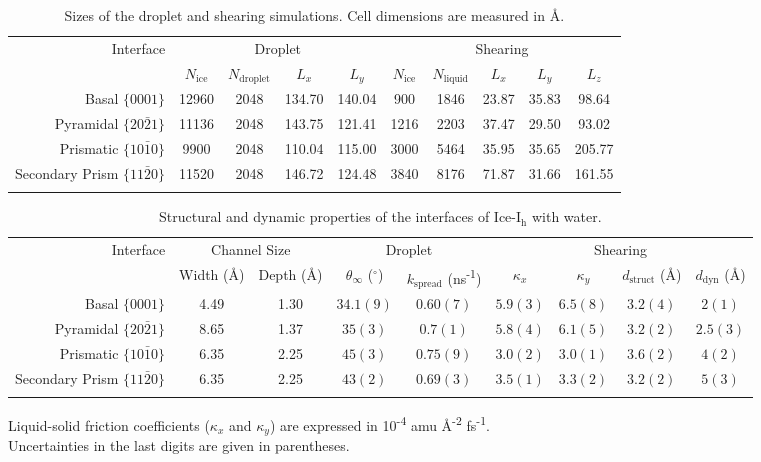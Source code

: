 \begin{table}[h]
\centering
\caption{Sizes of the droplet and shearing simulations.  Cell
  dimensions are measured in \AA. \label{tab:method}}
\begin{tabular}{r|cccc|ccccc} 
\toprule
 \multirow{2}{*}{Interface} & \multicolumn{4}{c|}{Droplet} & \multicolumn{5}{c}{
Shearing} \\
  & $N_\mathrm{ice}$ & $N_\mathrm{droplet}$ & $L_x$ & $L_y$ & $N_\mathrm{ice}$ &
 $N_\mathrm{liquid}$ & $L_x$ & $L_y$ & $L_z$  \\ 
\colrule
Basal  $\{0001\}$                    & 12960 & 2048 & 134.70 & 140.04 & 900 & 1846  & 23.87 & 35.83 & 98.64  \\
Pyramidal  $\{20\bar{2}1\}$       & 11136 & 2048 & 143.75 & 121.41 & 1216 & 2203 & 37.47 & 29.50 & 93.02  \\
Prismatic  $\{10\bar{1}0\}$       &  9900 & 2048 & 110.04 & 115.00 & 3000 & 5464 & 35.95 & 35.65 & 205.77 \\
Secondary Prism  $\{11\bar{2}0\}$ & 11520 & 2048 & 146.72 & 124.48 & 3840 & 8176 & 71.87 & 31.66 & 161.55 \\
\botrule
\end{tabular}
\end{table}


\begin{table}[h]
\centering
\caption{Structural and dynamic properties of the interfaces of
  Ice-I$_\mathrm{h}$ with water.\label{tab:kappa}}
\begin{tabular}{r|cc|cc|cccc}  
\toprule
\multirow{2}{*}{Interface} & \multicolumn{2}{c|}{Channel Size} &\multicolumn{2}{c|}{Droplet} & \multicolumn{4}{c}{Shearing\footnotemark[1]}\\
  & Width (\AA) & Depth (\AA) & $\theta_{\infty}$ ($^\circ$)  & $k_\mathrm{spread}$  (ns\textsuperscript{-1}) &
$\kappa_{x}$  & $\kappa_{y}$ & $d_\mathrm{struct}$ (\AA) &  $d_\mathrm{dyn}$ (\AA) \\ 
\colrule
Basal  $\{0001\}$                    & 4.49 & 1.30 & $34.1(9)$ &$0.60(7)$
& $5.9(3)$ & $6.5(8)$ & $3.2(4)$ & $2(1)$  \\
Pyramidal  $\{20\bar{2}1\}$       & 8.65 & 1.37 & $35(3)$ &  $0.7(1)$ &
$5.8(4)$ & $6.1(5)$ & $3.2(2)$ & $2.5(3)$\\
Prismatic  $\{10\bar{1}0\}$       & 6.35 & 2.25 & $45(3)$ & $0.75(9)$ &
$3.0(2)$ & $3.0(1)$ & $3.6(2)$ & $4(2)$ \\
Secondary Prism  $\{11\bar{2}0\}$ & 6.35 & 2.25 & $43(2)$ & $0.69(3)$ &
$3.5(1)$ & $3.3(2)$ & $3.2(2)$ & $5(3)$ \\ 
\botrule
\end{tabular}
\begin{flushleft}
\footnotemark[1]\footnotesize{Liquid-solid friction coefficients ($\kappa_x$ and
  $\kappa_y$) are expressed in 10\textsuperscript{-4} amu
  \AA\textsuperscript{-2} fs\textsuperscript{-1}.} \\
\footnotemark[2]\footnotesize{Uncertainties in
  the last digits are given in parentheses.} 
\end{flushleft}
\end{table}


